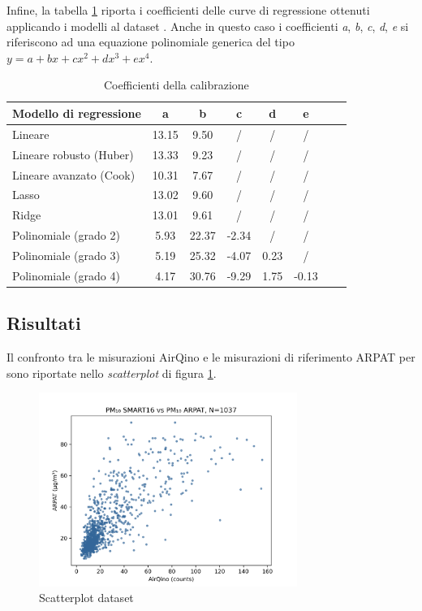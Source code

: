 Infine, la tabella \ref{fig:risultati-pm2.5-coefficienti} riporta i coefficienti delle curve di regressione ottenuti applicando i modelli al dataset . Anche in questo caso i coefficienti \textit{a}, \textit{b}, \textit{c}, \textit{d}, \textit{e} si riferiscono ad una equazione polinomiale generica del tipo $y=a+bx+cx^2+dx^3+ex^4$.

\begin{table}[H]
    \footnotesize
    \centering
    \begin{tabular}{|l|c|c|c|c|c|c|c|}
    \hline
        \textbf{Modello di regressione} & \textbf{a} & \textbf{b} & \textbf{c} & \textbf{d} & \textbf{e} \\ \hline
        Lineare & 13.15 & 9.50 & / & / & / \\ \hline
        Lineare robusto (Huber) & 13.33 & 9.23 & / & / & / \\ \hline
        Lineare avanzato (Cook) & 10.31 & 7.67 & / & / & / \\ \hline
        Lasso & 13.02 & 9.60 & / & / & / \\ \hline
        Ridge & 13.01 & 9.61 & / & / & / \\ \hline
        Polinomiale (grado 2) & 5.93 & 22.37 & -2.34 & / & / \\ \hline
        Polinomiale (grado 3) & 5.19 & 25.32 & -4.07 & 0.23 & / \\ \hline
        Polinomiale (grado 4) & 4.17 & 30.76 & -9.29 & 1.75 & -0.13 \\ \hline
    \end{tabular}
    \caption{Coefficienti della calibrazione }
    \label{fig:risultati-pm2.5-coefficienti}
\end{table}


\subsection{Risultati }\label{ssec:risultati-pm10}

Il confronto tra le misurazioni AirQino e le misurazioni di riferimento ARPAT per  sono riportate nello \textit{scatterplot} di figura \ref{fig:scatterplot_pm10}.

\begin{figure}[H]
\centering
\includegraphics[width=0.75\textwidth,height=\textheight,keepaspectratio]{img/sc_pm10.png}
\caption{Scatterplot dataset }
\label{fig:scatterplot_pm10}
\end{figure}

